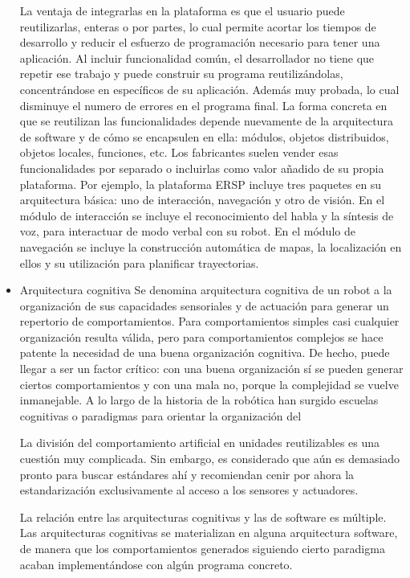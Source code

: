 \begin{itemize}
	La ventaja de integrarlas en la plataforma es que el usuario puede reutilizarlas, enteras o por partes, lo cual permite acortar los tiempos de desarrollo y reducir el esfuerzo de programación necesario para tener una aplicación. Al incluir funcionalidad común, el desarrollador no tiene que repetir ese trabajo y puede construir su programa reutilizándolas, concentrándose en específicos de su aplicación. Además muy probada, lo cual disminuye el numero de errores en el programa final.
	La forma concreta en que se reutilizan las funcionalidades depende nuevamente de la arquitectura de software y de cómo se encapsulen en ella: módulos, objetos distribuidos, objetos locales, funciones, etc.
	Los fabricantes suelen vender esas funcionalidades por separado o incluirlas como valor añadido de su propia plataforma. Por ejemplo, la plataforma ERSP incluye tres paquetes en su arquitectura básica: uno de interacción, navegación y otro de visión. En el módulo de interacción se incluye el reconocimiento del habla y la síntesis de voz, para interactuar de modo verbal con su robot. En el módulo de navegación se incluye la construcción automática de mapas, la localización en ellos y su utilización para planificar trayectorias.

	\item Arquitectura cognitiva
	Se denomina arquitectura cognitiva de un robot a la organización de sus capacidades sensoriales y de actuación para generar un repertorio de comportamientos. Para comportamientos simples casi cualquier organización resulta válida, pero para comportamientos complejos se hace patente la necesidad de una buena organización cognitiva. De hecho, puede llegar a ser un factor crítico: con una buena organización sí se pueden generar ciertos comportamientos y con una mala no, porque la complejidad se vuelve inmanejable. A lo largo de la historia de la robótica han surgido escuelas cognitivas o paradigmas para orientar la organización del

	La división del comportamiento artificial en unidades reutilizables es una cuestión muy complicada. Sin embargo, es considerado que aún es demasiado pronto para buscar estándares ahí y recomiendan cenir por ahora la estandarización exclusivamente al acceso a los sensores y actuadores.

	La relación entre las arquitecturas cognitivas y las de software es múltiple. Las arquitecturas cognitivas se materializan en alguna arquitectura software, de manera que los comportamientos generados siguiendo cierto paradigma acaban implementándose con algún programa concreto.


\end{itemize}
